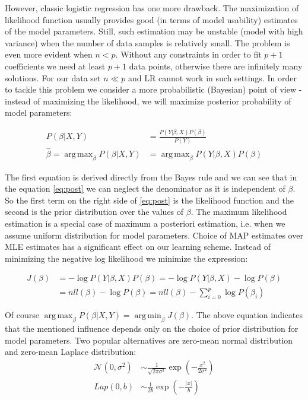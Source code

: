 \documentclass[shortabstract, english, mgr]{iithesis}
\DeclareMathOperator*{\argmax}{arg\,max}
\DeclareMathOperator*{\argmin}{arg\,min}
\begin{document}
However, classic logistic regression has one more drawback. The maximization of likelihood function usually provides good (in terms of model usability) estimates of the model parameters. Still, such estimation may be unstable (model with high variance) when the number of data samples is relatively small. The problem is even more evident when $n < p$. Without any constraints in order to fit $p+1$ coefficients we need at least $p+1$ data points, otherwise there are infinitely many solutions. For our data set $n \ll p$ and LR cannot work in such settings. In order to tackle this problem we consider a more probabilistic (Bayesian) point of view - instead of maximizing the likelihood, we will maximize posterior probability of model parameters:

\begin{align}
    P(\beta| X,Y) &= \frac{P(Y | \beta, X)P(\beta)}{P(Y)} \nonumber \\
    \hat{\beta} = \argmax_{\beta} P(\beta| X,Y) &= \argmax_{\beta} P(Y | \beta, X)P(\beta) \label{eq:post}
\end{align}

The first equation is derived directly from the Bayes rule and we can see that in the equation \ref{eq:post} we can neglect the denominator as it is independent of $\beta$. So the first term on the right side of \ref{eq:post} is the likelihood function and the second is the prior distribution over the values of $\beta$. The maximum likelihood estimation is a special case of maximum a posteriori estimation, i.e. when we assume uniform distribution for model parameters.  Choice of MAP estimates over MLE estimates has a significant effect on our learning scheme. Instead of minimizing the negative log likelihood we minimize the expression:

\begin{align}
    J(\beta) &= - \log P(Y | \beta, X)P(\beta) =  - \log P(Y | \beta, X) - \log P(\beta) \nonumber \\ &= nll(\beta) - \log P(\beta) = nll(\beta) - \sum_{i=0}^p \log P(\beta_i) \label{eq:learnPost}
\end{align}

Of course $\argmax_{\beta} P(\beta| X,Y) = \argmin_{\beta} J(\beta)$. The above equation indicates that the mentioned influence depends only on the choice of prior distribution for model parameters. Two popular alternatives are zero-mean normal distribution and zero-mean Laplace distribution:
\begin{align*}
    \mathcal{N}(0, \sigma^2) &\sim \frac{1}{\sqrt{2 \pi \sigma^{2}}} \exp \left(-\frac{x^{2}}{2 \sigma^{2}}\right) \\
    Lap(0, b) &\sim \frac{1}{2 b} \exp \left(-\frac{|x|}{b}\right)
\end{align*}
\end{document}
